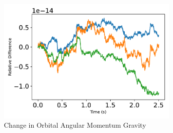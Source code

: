 \begin{figure}[htbp]\centerline{\includegraphics[width=0.8\textwidth]{AutoTeX/ChangeInOrbitalAngularMomentumGravity}}\caption{Change in Orbital Angular Momentum Gravity}\label{fig:ChangeInOrbitalAngularMomentumGravity}\end{figure}